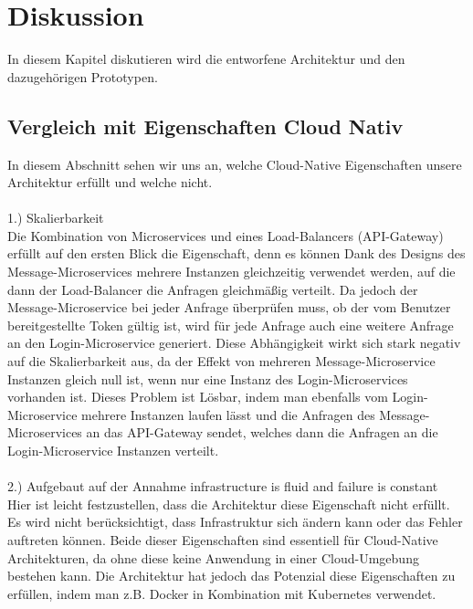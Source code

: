 \chapter{Diskussion}
In diesem Kapitel diskutieren wird die entworfene Architektur und den dazugehörigen Prototypen.

\section{Vergleich mit Eigenschaften Cloud Nativ}
In diesem Abschnitt sehen wir uns an, welche Cloud-Native Eigenschaften unsere Architektur erfüllt und welche nicht.\\
\\
1.) Skalierbarkeit\\
Die Kombination von Microservices und eines Load-Balancers (API-Gateway) erfüllt auf den ersten Blick die Eigenschaft, denn es können Dank des Designs des Message-Microservices mehrere Instanzen gleichzeitig verwendet werden, auf die dann der Load-Balancer die Anfragen gleichmäßig verteilt. Da jedoch der Message-Microservice bei jeder Anfrage überprüfen muss, ob der vom Benutzer bereitgestellte Token gültig ist, wird für jede Anfrage auch eine weitere Anfrage an den Login-Microservice generiert. Diese Abhängigkeit wirkt sich stark negativ auf die Skalierbarkeit aus, da der Effekt von mehreren Message-Microservice Instanzen gleich null ist, wenn nur eine Instanz des Login-Microservices vorhanden ist. Dieses Problem ist Lösbar, indem man ebenfalls vom Login-Microservice mehrere Instanzen laufen lässt und die Anfragen des Message-Microservices an das API-Gateway sendet, welches dann die Anfragen an die Login-Microservice Instanzen verteilt.\\
\\
2.) Aufgebaut auf der Annahme \glqq infrastructure is fluid and failure is constant\grqq{}\\
Hier ist leicht festzustellen, dass die Architektur diese Eigenschaft nicht erfüllt. Es wird nicht berücksichtigt, dass Infrastruktur sich ändern kann oder das Fehler auftreten können. Beide dieser Eigenschaften sind essentiell für Cloud-Native Architekturen, da ohne diese keine Anwendung in einer Cloud-Umgebung bestehen kann. Die Architektur hat jedoch das Potenzial diese Eigenschaften zu erfüllen, indem man z.B. Docker in Kombination mit Kubernetes verwendet.\\
\\
